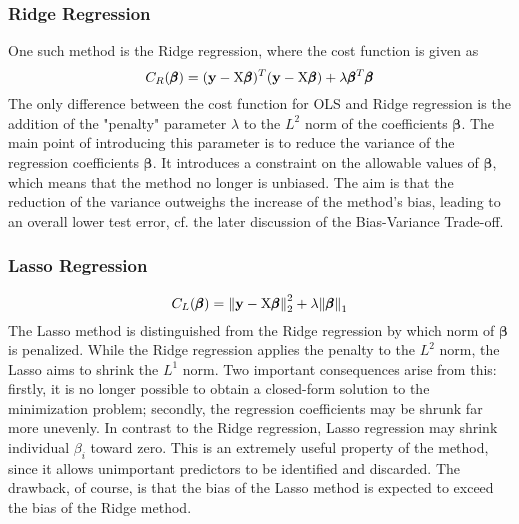 \documentclass[reprint, english, nofootinbib]{revtex4-2}
\begin{document}
        \subsubsection{Ridge Regression}
            \noindent
            One such method is the Ridge regression, where the cost function is given as
            \begin{equation}
                C_{R}(\pmb \beta)
                = (\mathbf y - \textup{X}\pmb\beta)^T(\mathbf y - \textup{X}\pmb\beta)
                + \lambda \pmb\beta^T\pmb\beta
            \end{equation}
			The only difference between the cost function for OLS and Ridge regression is the addition of the "penalty" parameter $\lambda$ to the $L^2$ norm of the coefficients $\pmb{\beta}$. The main point of introducing this parameter is to reduce the variance of the regression coefficients $\pmb{\beta}$. It introduces a constraint on the allowable values of $\pmb{\beta}$, which means that the method no longer is unbiased. The aim is that the reduction of the variance outweighs the increase of the method's bias, leading to an overall lower test error, cf. the later discussion of the Bias-Variance Trade-off.
        \subsubsection{Lasso Regression}
            \begin{equation}
                C_L(\pmb \beta) =
                \norm{\mathbf y - \textup{X}\pmb{\beta}}_2^2
                + \lambda\norm{\pmb{\beta}}_1
            \end{equation}
	       The Lasso method is distinguished from the Ridge regression by which norm of $\pmb{\beta}$ is penalized. While the Ridge regression applies the penalty to the $L^2$ norm, the Lasso aims to shrink the $L^1$ norm. Two important consequences arise from this: firstly, it is no longer possible to obtain a closed-form solution to the minimization problem; secondly, the regression coefficients may be shrunk far more unevenly. In contrast to the Ridge regression, Lasso regression may shrink individual $\beta_{i}$ toward zero. This is an extremely useful property of the method, since it allows unimportant predictors to be identified and discarded. The drawback, of course, is that the bias of the Lasso method is expected to exceed the bias of the Ridge method.
\end{document}
